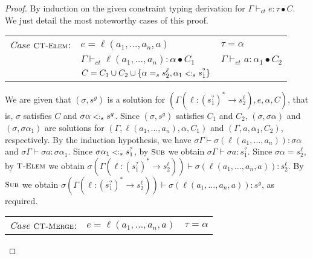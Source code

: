 \documentclass{eptcs}
\newcommand{\ih}{induction hypothesis\xspace}
\newcommand{\CC}{\ensuremath{C}\xspace}
\newcommand{\TElem}{{\small \textsc{T-Elem}}}
\newcommand{\Sub}{{\small \textsc{Sub}}}
\newcommand{\CTElem}{{\small \textsc{CT-Elem}}}
\newcommand{\CTMerge}{{\small \textsc{CT-Merge}}}
\newcommand{\sub}{\mathrel{\mbox{{\footnotesize $<:$}}}}
\newcommand{\ctvdash}{\ensuremath{\vdash_{ct}}}
\newcommand{\vsig}[2]{\ensuremath{{#1}^*\rightarrow{#2}}}
\begin{document}
\begin{proof}
By induction on the given constraint typing derivation for $\Gamma
\ctvdash e : \tau \bullet \CC$. We just detail the most noteworthy cases of this
proof.

\begin{flushleft}
\begin{tabular}{lll}
        \textit{Case} $\CTElem$:        & $e = \ell(a_1,\ldots,a_n,a)$
                                & $\tau = \alpha$                       \\
                                
                                & $\Gamma \ctvdash \ell(a_1,\ldots,a_n) : \alpha
                                \bullet \CC_1$                  
                                & $\Gamma \ctvdash a : \alpha_1 \bullet
                                \CC_2$                                  \\
                                
                                & $\CC = \CC_1 \cup \CC_2 \cup \{\alpha =_s
s_2^{\ell}, \alpha_1
                                \sub_s s_1^?\}$&        \\ 
\end{tabular}
\end{flushleft}

We are given that $(\sigma,s^g)$ is a solution for $(\Gamma(\ell :
\vsig{(s_1^?)}{s_2^{\ell}}), e, \alpha, \CC)$, that is, $\sigma$ satisfies $\CC$ and
$\sigma\alpha \sub_s s^g$. Since $(\sigma,s^g)$ satisfies $\CC_1$ and $\CC_2$,
$(\sigma, \sigma\alpha)$ and $(\sigma, \sigma\alpha_1)$ are solutions for
$(\Gamma, \ell(a_1,\ldots,a_n), \alpha, \CC_1)$ and $(\Gamma,a,\alpha_1,\CC_2)$,
respectively.
By the \ih, we have $\sigma\Gamma \vdash \sigma(\ell(a_1,\ldots,a_n)): \sigma\alpha$ and
$\sigma\Gamma \vdash \sigma a : \sigma\alpha_1$. Since $\sigma\alpha_1 \sub_s
s_1^?$, by $\Sub$ we obtain $\sigma\Gamma \vdash \sigma a : s_1^?$. Since $\sigma\alpha =
s_2^{\ell}$, by
$\TElem$ we obtain $\sigma(\Gamma(\ell : \vsig{(s_1^?)}{s_2^{\ell}})) \vdash
\sigma(\ell(a_1, \dots, a_n,
a)) : s_2^{\ell}$. By $\Sub$ we
obtain  $\sigma(\Gamma(\ell : \vsig{(s_1^?)}{s_2^{\ell}})) \vdash \sigma(\ell(a_1, \dots, a_n,
a)) : s^g$, as required.

\begin{flushleft}
\begin{tabular}{lll}
        \textit{Case} $\CTMerge$:       & $e = \ell(a_1,\ldots,a_n,a)$
                                & $\tau = \alpha$                       \\
                                

\end{tabular}
\end{flushleft}
\end{proof}
\end{document}
